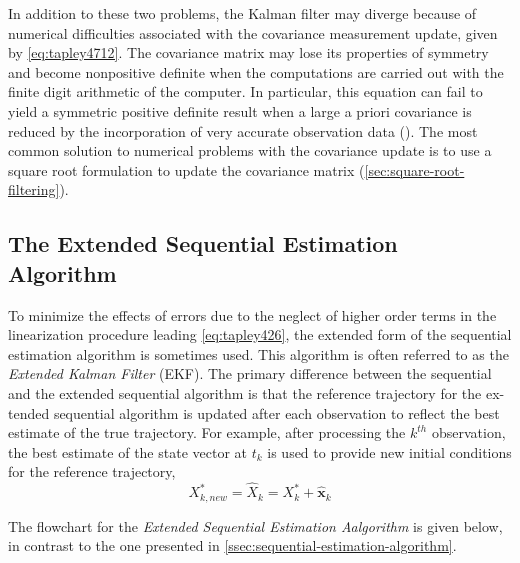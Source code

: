 In addition to these two problems, the Kalman filter may diverge because of
numerical difficulties associated with the covariance measurement update, given by 
\ref{eq:tapley4712}. The covariance matrix may lose its properties of symmetry and 
become nonpositive definite when the computations are carried out with the finite 
digit arithmetic of the computer. In particular, this equation can fail to yield a 
symmetric positive definite result when a large a priori covariance is reduced by 
the incorporation of very accurate observation data (\cite{tapley}). The most common 
solution to numerical problems with the covariance update is to use a square root 
formulation to update the covariance matrix (\ref{sec:square-root-filtering}).

\subsection{The Extended Sequential Estimation Algorithm}
To minimize the effects of errors due to the neglect of higher order terms in the
linearization procedure leading \ref{eq:tapley426}, the extended form of the sequential
estimation algorithm is sometimes used. This algorithm is often referred to as the
\emph{Extended Kalman Filter} (EKF). The primary difference between the sequential
and the extended sequential algorithm is that the reference trajectory for the ex-
tended sequential algorithm is updated after each observation to reflect the best
estimate of the true trajectory. For example, after processing the \(k^{th}\) observation, 
the best estimate of the state vector at \(t_k\) is used to provide new initial 
conditions for the reference trajectory,
\begin{equation}
  X^*_{k,new} = \hat{X}_k = X^*_k + \hat{\bm{x}}_k
\end{equation}

The flowchart for the \emph{Extended Sequential Estimation Aalgorithm} is given below, 
in contrast to the one presented in \ref{ssec:sequential-estimation-algorithm}.

